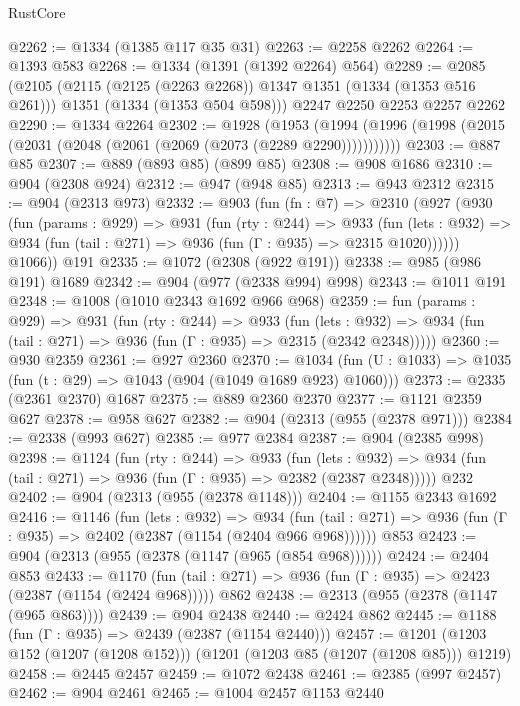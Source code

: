 \begin{lexlean}{RustCore}
\begin{coremodule}
@2262 := @1334 (@1385 @117 @35 @31)
@2263 := @2258 @2262
@2264 := @1393 @583
@2268 := @1334 (@1391 (@1392 @2264) @564)
@2289 := @2085
    (@2105
      (@2115 (@2125 (@2263 @2268)) @1347 @1351 (@1334 (@1353 @516 @261)))
      @1351
      (@1334 (@1353 @504 @598)))
    @2247
    @2250
    @2253
    @2257
    @2262
@2290 := @1334 @2264
@2302 := @1928
    (@1953 (@1994 (@1996 (@1998 (@2015 (@2031 (@2048 (@2061 (@2069 (@2073 (@2289 @2290)))))))))))
@2303 := @887 @85
@2307 := @889 (@893 @85) (@899 @85)
@2308 := @908 @1686
@2310 := @904 (@2308 @924)
@2312 := @947 (@948 @85)
@2313 := @943 @2312
@2315 := @904 (@2313 @973)
@2332 := @903
    (fun (fn : @7) =>
    @2310
      (@927
        (@930
          (fun (params : @929) =>
          @931
            (fun (rty : @244) =>
            @933
              (fun (lets : @932) =>
              @934 (fun (tail : @271) => @936 (fun (Γ : @935) => @2315 @1020))))))
        @1066))
    @191
@2335 := @1072 (@2308 (@922 @191))
@2338 := @985 (@986 @191) @1689
@2342 := @904 (@977 (@2338 @994) @998)
@2343 := @1011 @191
@2348 := @1008 (@1010 @2343 @1692 @966 @968)
@2359 := fun (params : @929) =>
  @931
    (fun (rty : @244) =>
    @933
      (fun (lets : @932) =>
      @934 (fun (tail : @271) => @936 (fun (Γ : @935) => @2315 (@2342 @2348)))))
@2360 := @930 @2359
@2361 := @927 @2360
@2370 := @1034 (fun (U : @1033) => @1035 (fun (t : @29) => @1043 (@904 (@1049 @1689 @923) @1060)))
@2373 := @2335 (@2361 @2370) @1687
@2375 := @889 @2360 @2370
@2377 := @1121 @2359 @627
@2378 := @958 @627
@2382 := @904 (@2313 (@955 (@2378 @971)))
@2384 := @2338 (@993 @627)
@2385 := @977 @2384
@2387 := @904 (@2385 @998)
@2398 := @1124
    (fun (rty : @244) =>
    @933
      (fun (lets : @932) =>
      @934 (fun (tail : @271) => @936 (fun (Γ : @935) => @2382 (@2387 @2348)))))
    @232
@2402 := @904 (@2313 (@955 (@2378 @1148)))
@2404 := @1155 @2343 @1692
@2416 := @1146
    (fun (lets : @932) =>
    @934 (fun (tail : @271) => @936 (fun (Γ : @935) => @2402 (@2387 (@1154 (@2404 @966 @968))))))
    @853
@2423 := @904 (@2313 (@955 (@2378 (@1147 (@965 (@854 @968))))))
@2424 := @2404 @853
@2433 := @1170
    (fun (tail : @271) => @936 (fun (Γ : @935) => @2423 (@2387 (@1154 (@2424 @968)))))
    @862
@2438 := @2313 (@955 (@2378 (@1147 (@965 @863))))
@2439 := @904 @2438
@2440 := @2424 @862
@2445 := @1188 (fun (Γ : @935) => @2439 (@2387 (@1154 @2440)))
@2457 := @1201 (@1203 @152 (@1207 (@1208 @152))) (@1201 (@1203 @85 (@1207 (@1208 @85))) @1219)
@2458 := @2445 @2457
@2459 := @1072 @2438
@2461 := @2385 (@997 @2457)
@2462 := @904 @2461
@2465 := @1004 @2457 @1153 @2440

\end{coremodule}
\end{lexlean}
